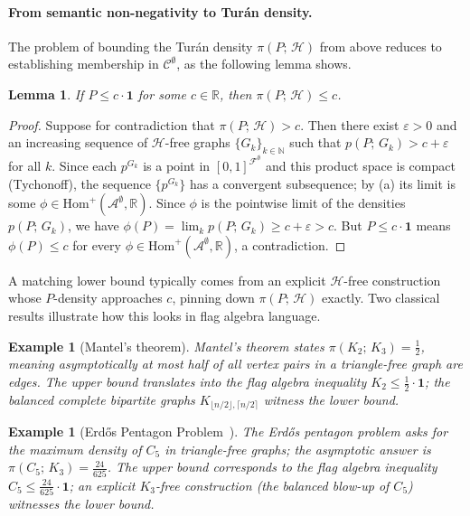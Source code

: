 \documentclass{article}
\newtheorem{lemma}[theorem]{Lemma}
\newtheorem{example}[theorem]{Example}
\newcommand{\poshom}[1]{\mathrm{Hom}^+(\mathcal{A}^{#1}, \mathbb{R})}
\newcommand{\den}[2]{p(#1;\,#2)}
\newcommand{\tdensity}[2]{\pi(#1;\,#2)}
\begin{document}
\paragraph{From semantic non-negativity to Tur\'an density.}
The problem of bounding the Turán density $\tdensity{P}{\mathcal{H}}$ from above
reduces to establishing membership in $\mathcal{C}^\emptyset$, as the following
lemma shows.

\begin{lemma}\label{lem:semantic-bound}
  If $P \leq c \cdot \mathbf{1}$ for some $c \in \mathbb{R}$, then
  $\tdensity{P}{\mathcal{H}} \leq c$.
\end{lemma}
\begin{proof}
  Suppose for contradiction that $\tdensity{P}{\mathcal{H}} > c$.  Then
  there exist $\varepsilon > 0$ and an increasing sequence of
  $\mathcal{H}$-free graphs $\{G_k\}_{k\in\mathbb{N}}$ such that
  $\den{P}{G_k} > c + \varepsilon$ for all $k$.  Since each $p^{G_k}$
  is a point in $[0,1]^{\mathcal{F}^\emptyset}$ and this product space is
  compact (Tychonoff), the sequence $\{p^{G_k}\}$ has a convergent
  subsequence; by (a) its limit is some
  $\phi \in \poshom{\emptyset}$.  Since $\phi$ is the pointwise limit of
  the densities $\den{P}{G_k}$, we have
  $\phi(P) = \lim_k \den{P}{G_k} \geq c + \varepsilon > c$.  But
  $P \leq c \cdot \mathbf{1}$ means $\phi(P) \leq c$ for every
  $\phi \in \poshom{\emptyset}$, a contradiction.
\end{proof}

A matching lower bound typically comes from an explicit $\mathcal{H}$-free construction
whose $P$-density approaches $c$, pinning down $\tdensity{P}{\mathcal{H}}$ exactly.
Two classical results illustrate how this looks in flag algebra language.

\begin{example}[Mantel's theorem]
  Mantel's theorem states $\tdensity{K_2}{K_3} = \tfrac{1}{2}$, meaning
  asymptotically at most half of all vertex pairs in a triangle-free graph
  are edges.  The upper bound translates into the flag algebra inequality
  $K_2 \leq \tfrac{1}{2}\cdot\mathbf{1}$; the balanced complete bipartite
  graphs $K_{\lfloor n/2\rfloor,\lceil n/2\rceil}$ witness the lower bound.
\end{example}

\begin{example}[Erd\H{o}s Pentagon Problem~{\cite{grzesik2012,hatami2012}}]
  The Erd\H{o}s pentagon problem asks for the maximum density of $C_5$ in
  triangle-free graphs; the asymptotic answer is $\tdensity{C_5}{K_3} = \tfrac{24}{625}$.  The upper bound corresponds to the flag algebra inequality
  $C_5 \leq \tfrac{24}{625}\cdot\mathbf{1}$; an explicit $K_3$-free construction
  (the balanced blow-up of $C_5$) witnesses the lower bound.
\end{example}
\end{document}
